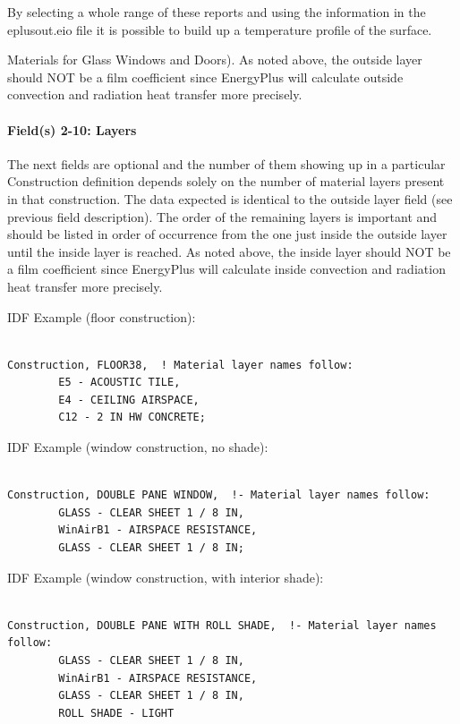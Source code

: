 By selecting a whole range of these reports and using the information in the eplusout.eio file it is possible to build up a temperature profile of the surface.

Materials for Glass Windows and Doors). As noted above, the outside layer should NOT be a film coefficient since EnergyPlus will calculate outside convection and radiation heat transfer more precisely.

\paragraph{Field(s) 2-10: Layers}\label{fields-2-10-layers}

The next fields are optional and the number of them showing up in a particular Construction definition depends solely on the number of material layers present in that construction. The data expected is identical to the outside layer field (see previous field description). The order of the remaining layers is important and should be listed in order of occurrence from the one just inside the outside layer until the inside layer is reached. As noted above, the inside layer should NOT be a film coefficient since EnergyPlus will calculate inside convection and radiation heat transfer more precisely.

IDF Example (floor construction):

\begin{lstlisting}

Construction, FLOOR38,  ! Material layer names follow:
        E5 - ACOUSTIC TILE,
        E4 - CEILING AIRSPACE,
        C12 - 2 IN HW CONCRETE;
\end{lstlisting}

IDF Example (window construction, no shade):

\begin{lstlisting}

Construction, DOUBLE PANE WINDOW,  !- Material layer names follow:
        GLASS - CLEAR SHEET 1 / 8 IN,
        WinAirB1 - AIRSPACE RESISTANCE,
        GLASS - CLEAR SHEET 1 / 8 IN;
\end{lstlisting}

IDF Example (window construction, with interior shade):

\begin{lstlisting}

Construction, DOUBLE PANE WITH ROLL SHADE,  !- Material layer names follow:
        GLASS - CLEAR SHEET 1 / 8 IN,
        WinAirB1 - AIRSPACE RESISTANCE,
        GLASS - CLEAR SHEET 1 / 8 IN,
        ROLL SHADE - LIGHT
\end{lstlisting}

